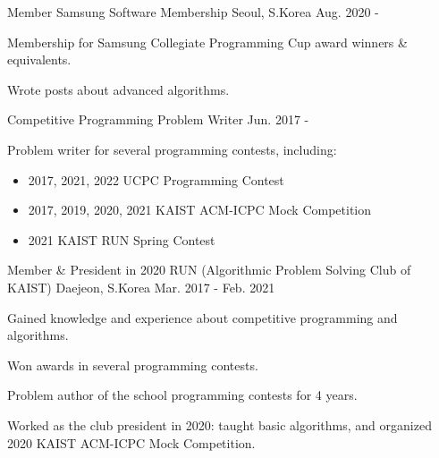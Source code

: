 

\begin{cventries}

\cventry
{Member} %
{Samsung Software Membership} %
{Seoul, S.Korea} %
{Aug. 2020 -} %
{
  \begin{cvitems} %
    \item {Membership for Samsung Collegiate Programming Cup award winners \& equivalents.}
    \item {Wrote posts about advanced algorithms.}
  \end{cvitems}
}

  \cventry
    {} %
    {Competitive Programming Problem Writer} %
    {} %
    {Jun. 2017 -} %
    {
      \begin{cvitems} %
        \item {Problem writer for several programming contests, including:
          \begin{itemize}
            \item 2017, 2021, 2022 UCPC Programming Contest
            \item 2017, 2019, 2020, 2021 KAIST ACM-ICPC Mock Competition
            \item 2021 KAIST RUN Spring Contest
          \end{itemize}
        }
      \end{cvitems}
    }


  \cventry
    {Member \& President in 2020} %
    {RUN (Algorithmic Problem Solving Club of KAIST)} %
    {Daejeon, S.Korea} %
    {Mar. 2017 - Feb. 2021} %
    {
      \begin{cvitems} %
        \item {Gained knowledge and experience about competitive programming and algorithms.}
        \item {Won awards in several programming contests.}
        \item {Problem author of the school programming contests for 4 years.}
        \item {Worked as the club president in 2020: taught basic algorithms, and organized 2020 KAIST ACM-ICPC Mock Competition.}
      \end{cvitems}
    }

\end{cventries}
